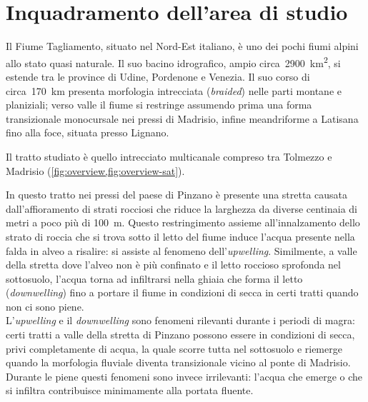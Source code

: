 \section{Inquadramento dell'area di studio}
Il Fiume Tagliamento, situato nel Nord-Est italiano, è uno dei pochi fiumi alpini allo stato quasi naturale. 
Il suo bacino idrografico, ampio circa~\SI{2900}{\kilo\m\tothe{2}}, si estende tra le province di Udine, Pordenone e Venezia.
Il suo corso di circa~\SI{170}{\kilo\m} presenta morfologia intrecciata (\emph{braided}) nelle parti montane e planiziali; verso valle il fiume si restringe assumendo prima una forma transizionale monocursale nei pressi di Madrisio, infine meandriforme a Latisana fino alla foce, situata presso Lignano.


Il tratto studiato è quello intrecciato multicanale compreso tra Tolmezzo e Madrisio (\vref{fig:overview,fig:overview-sat}). 

In questo tratto nei pressi del paese di Pinzano è presente una stretta causata dall'affioramento di strati rocciosi che riduce la larghezza da diverse centinaia di metri a poco più di \SI{100}{\m}.
Questo restringimento assieme all'innalzamento dello strato di roccia che si trova sotto il letto del fiume induce l'acqua presente nella falda in alveo a risalire: si assiste al fenomeno dell'\emph{upwelling}. 
Similmente, a valle della stretta dove l'alveo non è più confinato e il letto roccioso sprofonda nel sottosuolo, l'acqua torna ad infiltrarsi nella ghiaia che forma il letto (\emph{downwelling}) fino a portare il fiume in condizioni di secca in certi tratti quando non ci sono piene.
\\
L'\emph{upwelling} e il \emph{downwelling} sono fenomeni rilevanti durante i periodi di magra: certi tratti a valle della stretta di Pinzano possono essere in condizioni di secca, privi completamente di acqua, la quale scorre tutta nel sottosuolo e riemerge quando la morfologia fluviale diventa transizionale vicino al ponte di Madrisio.
Durante le piene questi fenomeni sono invece irrilevanti: l'acqua che emerge o che si infiltra contribuisce minimamente alla portata fluente.


